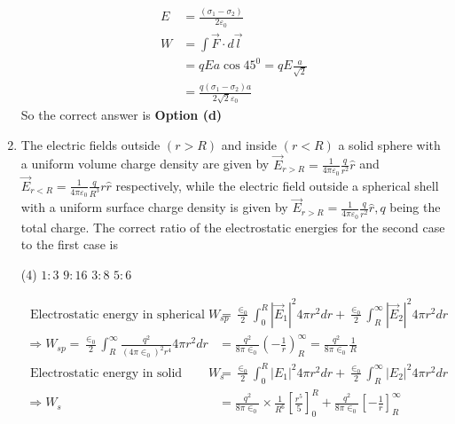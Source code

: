 \begin{enumerate}
\begin{tasks}
\end{tasks}	
\begin{answer}
	$$
	\begin{aligned}
	E&=\frac{\left(\sigma_{1}-\sigma_{2}\right)}{2 \varepsilon_{0}}\\ W&=\int \vec{F} \cdot d \vec{l}\\&=q E a \cos 45^{0}=q E \frac{a}{\sqrt{2}}\\&=\frac{q\left(\sigma_{1}-\sigma_{2}\right) a}{2 \sqrt{2} \varepsilon_{0}}
\end{aligned}
$$
So the correct answer is \textbf{Option (d)}
\end{answer}
\item  The electric fields outside $(r>R)$ and inside $(r<R)$ a solid sphere with a uniform volume charge density are given by $\vec{E}_{r>R}=\frac{1}{4 \pi \varepsilon_{0}} \frac{q}{r^{2}} \hat{r}$ and $\vec{E}_{r<R}=\frac{1}{4 \pi \varepsilon_{0}} \frac{q}{R^{3}} r \hat{r}$ respectively, while the electric field outside a spherical shell with a uniform surface charge density is given by	$\vec{E}_{r>R}=\frac{1}{4 \pi \varepsilon_{0}} \frac{q}{r^{2}} \hat{r}, q$ being the total charge. The correct ratio of the electrostatic energies for the second case to the first case is
 \begin{tasks}(4)
	\task[\textbf{a.}]$1: 3$
	\task[\textbf{b.}]$9: 16$
	\task[\textbf{c.}]$3: 8$
	\task[\textbf{d.}]$5: 6$ 
\end{tasks}	
\begin{answer}
	$$
	\begin{aligned}
	\text { Electrostatic energy in spherical shell } W_{s p}&=\frac{\in_{0}}{2} \int_{0}^{R}\left|\vec{E}_{1}\right|^{2} 4 \pi r^{2} d r+\frac{\in_{0}}{2} \int_{R}^{\infty}\left|\vec{E}_{2}\right|^{2} 4 \pi r^{2} d r\\
	\Rightarrow W_{s p}=\frac{\in_{0}}{2} \int_{R}^{\infty} \frac{q^{2}}{\left(4 \pi \in_{0}\right)^{2} r^{4}} 4 \pi r^{2} d r&=\frac{q^{2}}{8 \pi \in_{0}}\left(-\frac{1}{r}\right)_{R}^{\infty}=\frac{q^{2}}{8 \pi \in_{0}} \frac{1}{R}\\
	\text { Electrostatic energy in solid sphere } W_{s}&=\frac{\in_{0}}{2} \int_{0}^{R}\left|E_{1}\right|^{2} 4 \pi r^{2} d r+\frac{\in_{0}}{2} \int_{R}^{\infty}\left|E_{2}\right|^{2} 4 \pi r^{2} d r\\
	\Rightarrow W_{s}&=\frac{q^{2}}{8 \pi \in_{0}} \times \frac{1}{R^{6}}\left[\frac{r^{5}}{5}\right]_{0}^{R}+\frac{q^{2}}{8 \pi \in_{0}}\left[-\frac{1}{r}\right]_{R}^{\infty}\\

\end{aligned}$$
\end{answer}
\end{enumerate}
